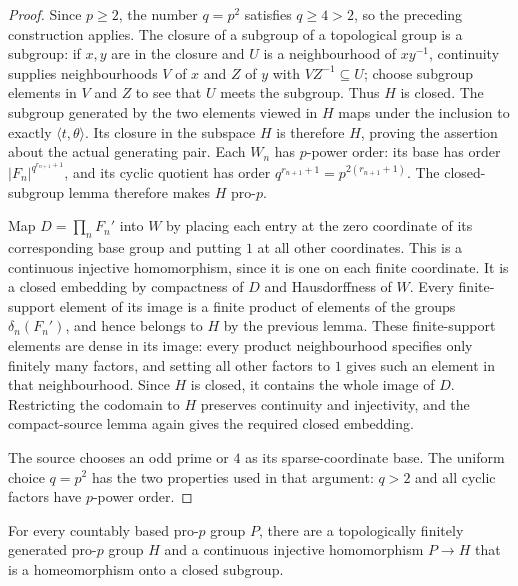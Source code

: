 \begin{proof}
Since $p\ge2$, the number $q=p^2$ satisfies $q\ge4>2$,
so the preceding construction applies.
The closure of a subgroup of a topological group is a subgroup:
if $x,y$ are in the closure and $U$ is a neighbourhood of $xy^{-1}$,
continuity supplies neighbourhoods $V$ of $x$ and $Z$ of $y$
with $VZ^{-1}\subseteq U$; choose subgroup elements in $V$ and $Z$
to see that $U$ meets the subgroup. Thus $H$ is closed.
The subgroup generated by the two elements viewed in $H$
maps under the inclusion to exactly $\langle t,\theta\rangle$.
Its closure in the subspace $H$ is therefore $H$, proving
the assertion about the actual generating pair.
Each $W_n$ has $p$-power order: its base has order
$|F_n|^{q^{r_{n+1}+1}}$, and its cyclic quotient has order
$q^{r_{n+1}+1}=p^{2(r_{n+1}+1)}$.
The closed-subgroup lemma therefore makes $H$ pro-$p$.

Map $D=\prod_nF_n'$ into $W$ by placing each entry at the
zero coordinate of its corresponding base group and putting
$1$ at all other coordinates. This is a continuous injective
homomorphism, since it is one on each finite coordinate.
It is a closed embedding by compactness of $D$ and Hausdorffness
of $W$. Every finite-support element of its image is a finite
product of elements of the groups $\delta_n(F_n')$, and hence
belongs to $H$ by the previous lemma.
These finite-support elements are dense in its image: every
product neighbourhood specifies only finitely many factors,
and setting all other factors to $1$ gives such an element
in that neighbourhood. Since $H$ is closed, it contains the
whole image of $D$. Restricting the codomain to $H$ preserves
continuity and injectivity, and the compact-source lemma again
gives the required closed embedding.

The source chooses an odd prime or $4$ as its sparse-coordinate
base. The uniform choice $q=p^2$ has the two properties used in
that argument: $q>2$ and all cyclic factors have $p$-power order.
\end{proof}

\begin{theorem}
\label{thm:lubotzky-wilson-pro-p}
\leanok
For every countably based pro-$p$ group $P$, there are a
topologically finitely generated pro-$p$ group $H$ and a
continuous injective homomorphism $P\to H$ that is a
homeomorphism onto a closed subgroup.
\end{theorem}

